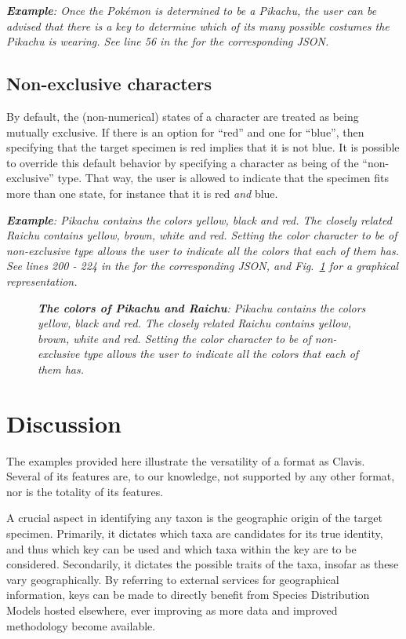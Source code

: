 \documentclass[10pt,letterpaper]{article}
\begin{document}

\textit{\textbf{Example}: Once the Pokémon is determined to be a Pikachu, the user can be advised that there is a key to determine which of its many possible costumes the Pikachu is wearing. See line 56 in the  for the corresponding JSON.}
\subsection*{
Non-exclusive characters
}
By default, the (non-numerical) states of a character are treated as being mutually exclusive. If there is an option for ``red'' and one for ``blue'', then specifying that the target specimen is red implies that it is not blue. It is possible to override this default behavior by specifying a character as being of the ``non-exclusive'' type. That way, the user is allowed to indicate that the specimen fits more than one state, for instance that it is red \textit{and} blue.

\textit{\textbf{Example}: Pikachu contains the colors yellow, black and red. The closely related Raichu contains yellow, brown, white and red. Setting the color character to be of non-exclusive type allows the user to indicate all the colors that each of them has. See lines 200 - 224 in the  for the corresponding JSON, and Fig.~\ref{fig4} for a graphical representation.}

\begin{figure}[!h]
  \caption{\textit{\textbf{The colors of Pikachu and Raichu}:
Pikachu contains the colors yellow, black and red. The closely related Raichu contains yellow, brown, white and red. Setting the color character to be of non-exclusive type allows the user to indicate all the colors that each of them has.
}}
 \label{fig4}
\end{figure}

\section*{
Discussion
}
The examples provided here illustrate the versatility of a format as Clavis. Several of its features are, to our knowledge, not supported by any other format, nor is the totality of its features.

A crucial aspect in identifying any taxon is the geographic origin of the target specimen. Primarily, it dictates which taxa are candidates for its true identity, and thus which key can be used and which taxa within the key are to be considered. Secondarily, it dictates the possible traits of the taxa, insofar as these vary geographically. By referring to external services for geographical information, keys can be made to directly benefit from Species Distribution Models hosted elsewhere, ever improving as more data and improved methodology become available.
\end{document}
